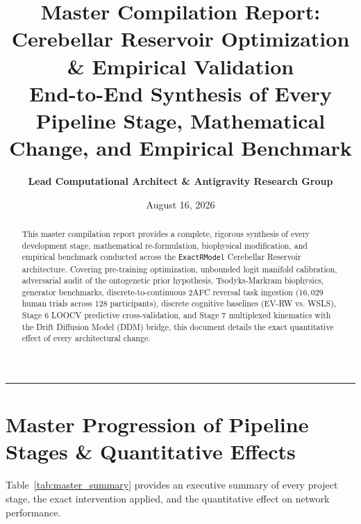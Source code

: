 \documentclass[11pt,a4paper]{article}
\title{\Huge \textbf{\color{navyblue} Master Compilation Report: Cerebellar Reservoir Optimization \& Empirical Validation}\\[0.4em]
\large End-to-End Synthesis of Every Pipeline Stage, Mathematical Change, and Empirical Benchmark}
\author{\textbf{Lead Computational Architect \& Antigravity Research Group}}
\date{August 16, 2026}
\begin{document}
\maketitle

\begin{abstract}
This master compilation report provides a complete, rigorous synthesis of every development stage, mathematical re-formulation, biophysical modification, and empirical benchmark conducted across the \texttt{ExactRModel} Cerebellar Reservoir architecture. Covering pre-training optimization, unbounded logit manifold calibration, adversarial audit of the ontogenetic prior hypothesis, Tsodyks-Markram biophysics, generator benchmarks, discrete-to-continuous 2AFC reversal task ingestion ($16,029$ human trials across 128 participants), discrete cognitive baselines (EV-RW vs. WSLS), Stage 6 LOOCV predictive cross-validation, and Stage 7 multiplexed kinematics with the Drift Diffusion Model (DDM) bridge, this document details the exact quantitative effect of every architectural change.
\end{abstract}

\vspace{0.8em}
\hrule
\vspace{0.8em}

\section{Master Progression of Pipeline Stages \& Quantitative Effects}

Table~\ref{tab:master_summary} provides an executive summary of every project stage, the exact intervention applied, and the quantitative effect on network performance.
\end{document}
